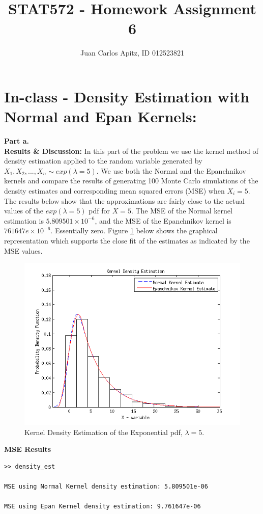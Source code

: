 \documentclass[12pt,a4paper]{article}
\author{Juan Carlos Apitz, ID 012523821}
\title{STAT572 - Homework Assignment 6}
\begin{document}
\maketitle

\section*{In-class - Density Estimation with Normal and Epan Kernels:}

\textbf{Part a.}\\

\textbf{Results \& Discussion: }
In this part of the problem we use the kernel method of density estimation applied to the random variable generated by $X_1,X_2,...,X_n \sim exp(\lambda=5)$. We use both the Normal and the Epanchnikov kernels and compare the results of generating 100 Monte Carlo simulations of the density estimates and corresponding mean squared errors (MSE) when $X_i = 5$.\\

The results below show that the approximations are fairly close to the actual values of the $exp(\lambda=5)$ pdf for $X = 5$. The MSE of the Normal kernel estimation is $5.809501\times10^{-6}$, and the MSE of the Epanchnikov kernel is $761647e\times10^{-6}$. Essentially zero. Figure \ref{inclass fig1} below shows the graphical representation which supports the close fit of the estimates as indicated by the MSE values.

\begin{figure}[ht!] 
\begin{center}
\includegraphics[scale=.87]{inclass_grapha.png}
\caption{Kernel Density Estimation of the Exponential pdf, $\lambda=5$.}
\label{inclass fig1}
\end{center}
\end{figure}
\FloatBarrier
\clearpage
\textbf{MSE Results}
\begin{verbatim}
>> density_est

MSE using Normal Kernel density estimation: 5.809501e-06

MSE using Epan Kernel density estimation: 9.761647e-06
\end{verbatim}
\end{document}
